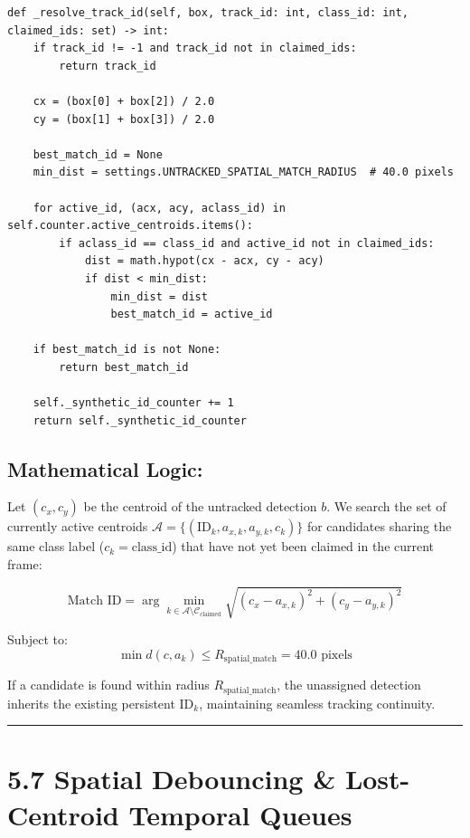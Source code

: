 \begin{verbatim}
def _resolve_track_id(self, box, track_id: int, class_id: int, claimed_ids: set) -> int:
    if track_id != -1 and track_id not in claimed_ids:
        return track_id

    cx = (box[0] + box[2]) / 2.0
    cy = (box[1] + box[3]) / 2.0

    best_match_id = None
    min_dist = settings.UNTRACKED_SPATIAL_MATCH_RADIUS  # 40.0 pixels

    for active_id, (acx, acy, aclass_id) in self.counter.active_centroids.items():
        if aclass_id == class_id and active_id not in claimed_ids:
            dist = math.hypot(cx - acx, cy - acy)
            if dist < min_dist:
                min_dist = dist
                best_match_id = active_id

    if best_match_id is not None:
        return best_match_id

    self._synthetic_id_counter += 1
    return self._synthetic_id_counter
\end{verbatim}

\subsection{Mathematical Logic:}\label{mathematical-logic}

Let \((c_x, c_y)\) be the centroid of the untracked detection \(b\). We
search the set of currently active centroids
\(\mathcal{A} = \{ (\text{ID}_k, a_{x, k}, a_{y, k}, c_k) \}\) for
candidates sharing the same class label (\(c_k = \text{class\_id}\))
that have not yet been claimed in the current frame:

\[\text{Match ID} = \arg\min_{k \in \mathcal{A} \setminus \mathcal{C}_{\text{claimed}}} \sqrt{(c_x - a_{x, k})^2 + (c_y - a_{y, k})^2}\]

Subject to:
\[\min d(c, a_k) \le R_{\text{spatial\_match}} = 40.0\text{ pixels}\]

If a candidate is found within radius \(R_{\text{spatial\_match}}\), the
unassigned detection inherits the existing persistent \(\text{ID}_k\),
maintaining seamless tracking continuity.

\begin{center}\rule{0.5\linewidth}{0.5pt}\end{center}

\section{5.7 Spatial Debouncing \& Lost-Centroid Temporal
Queues}\label{spatial-debouncing-lost-centroid-temporal-queues}

